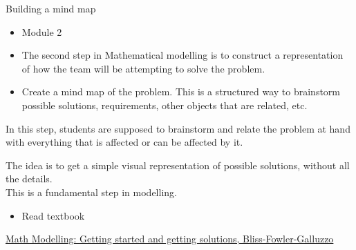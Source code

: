\standardonlynewpage


%
%



\begin{module}{Building a mind map}
	\label{mindmap}

	
	
\end{module}



\begin{lesson}


	\begin{itemize}
		\item Module 2
	\end{itemize}

	\begin{itemize}

		\item The second step in Mathematical modelling is to construct a representation of how the team will be attempting to solve the problem.

		\item Create a mind map of the problem. This is a structured way to brainstorm possible solutions, requirements, other objects that are related, etc.
	\end{itemize}
	

In this step, students are supposed to brainstorm and relate the problem at hand with everything that is affected or can be affected by it.

The idea is to get a simple visual representation of possible solutions, without all the details. \\

This is a fundamental step in modelling.


\begin{itemize}
	\item Read textbook
\end{itemize}


\begin{annotation}
	\begin{goals}
	\end{goals}
\end{annotation}
	 \href{https://m3challenge.siam.org/resources/modeling-handbook}{Math Modelling: Getting started and getting solutions, Bliss-Fowler-Galluzzo}

\end{lesson}




